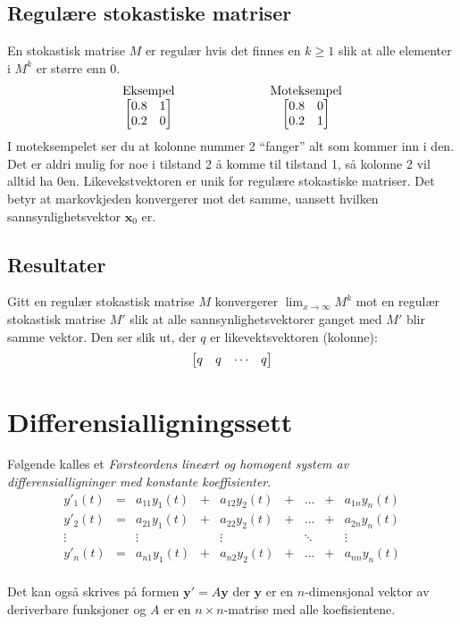 \documentclass[12pt,a4paper,norsk]{article}
\makeatletter
\newcommand{\mat}[2]{\left[\begin{array}{@{}#1@{}}#2\end{array}\right]}
\newcommand{\vx}{\textbf{x}}
\newcommand{\vy}{\textbf{y}}
\makeatother
\begin{document}
\subsection{Regulære stokastiske matriser}
En stokastisk matrise $M$ er regulær hvis det finnes en $k \ge 1$ slik at alle
elementer i $M^{k}$ er større enn $0$.
\[\begin{array}{ccc}
  \text{Eksempel} & \hspace{20mm} & \text{Moteksempel} \\
  \mat{cc}{0.8 & 1 \\ 0.2 & 0} & & \mat{cc}{0.8 & 0 \\ 0.2 & 1}
  \end{array}\]
I moteksempelet ser du at kolonne nummer 2 ``fanger'' alt som kommer inn i den.
Det er aldri mulig for noe i tilstand 2 å komme til tilstand 1, så kolonne 2 vil
alltid ha $0$en.
Likevekstvektoren er unik for regulære stokastiske matriser. Det betyr at
markovkjeden konvergerer mot det samme, uansett hvilken sannsynlighetsvektor
$\vx_{0}$ er.

\subsection{Resultater}
Gitt en regulær stokastisk matrise $M$ konvergerer $\lim_{x\to\infty}M^{k}$ mot en
regulær stokastisk matrise $M'$ slik at alle sannsynlighetsvektorer ganget med
$M'$ blir samme vektor. Den ser slik ut, der $q$ er likevektsvektoren (kolonne):
\[
  \mat{cccc}{q & q & \cdots & q}
\]

\section{Differensialligningssett}
Følgende kalles et \textit{Førsteordens lineært og homogent system av
  differensialligninger med konstante koeffisienter}.
\[
\begin{array}{ccccccccc}
  y'_1(t) &=& a_{11}y_1(t) &+& a_{12}y_2(t) &+& \ldots &+& a_{1n}y_n(t) \\
  y'_2(t) &=& a_{21}y_1(t) &+& a_{22}y_2(t) &+& \ldots &+& a_{2n}y_n(t) \\
  \vdots && \vdots && \vdots && \ddots &&  \vdots \\
  y'_n(t) &=& a_{n1}y_1(t) &+& a_{n2}y_2(t) &+& \ldots &+& a_{nn}y_n(t) \\
\end{array}
\]

Det kan også skrives på formen $\vy' = A\vy$ der $\vy$ er en $n$-dimensjonal vektor av
deriverbare funksjoner og $A$ er en $n \times n$-matrise med alle koefisientene.
\end{document}
